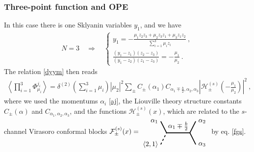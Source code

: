 \documentclass[12pt, a4paper, notitlepage, twoside]{report}
\numberwithin{equation}{section}
\theoremstyle{break}
\begin{document}
\subsubsection{Three-point function and OPE}

In this case there is one Sklyanin variables $y_1$, and we have
\begin{align}
 N=3 \quad \Rightarrow \quad  \left\{\begin{array}{l} y_1 = -\frac{\mu_1z_2z_3+\mu_2z_3z_1+\mu_3z_1z_2}{\sum_{i=1}^3\mu_iz_i}\ , \\ \frac{(y_1-z_1)(z_2-z_3)}{(y_1-z_2)(z_1-z_3)} = -\frac{\mu_1}{\mu_2}\ . \end{array}\right.
\end{align}
The relation \eqref{dyym} then reads 
\begin{align}
 \left\langle \prod_{i=1}^3\Phi^{j_i}_{\mu_i} \right\rangle = \delta^{(2)}(\textstyle{\sum}_{i=1}^3\mu_i) |\mu_2|^2 \sum_\pm C_\pm(\alpha_1)C_{\alpha_1\mp\frac{b}{2},\alpha_2,\alpha_3} \left|\mathcal{H}^{(s)}_\pm(-\tfrac{\mu_1}{\mu_2})  \right|^2\ , 
\label{sfpm}
\end{align}
where we used the momentums $\alpha_i$ \eqref{aj}, the Liouville theory structure constants $C_\pm(\alpha)$ and $C_{\alpha_1,\alpha_2,\alpha_3}$, and the functions $\mathcal{H}^{(s)}_\pm(x)$, which are related to the 
$s$-channel Virasoro conformal blocks  
$
 \mathcal{F}^{(s)}_\pm(x)  =  
\begin{tikzpicture}[baseline=(current  bounding  box.center), very thick, scale = .3]
\draw (-1,2) node [left] {$\alpha_1$} -- (0,0) -- node [above] {$\alpha_1\mp \frac{b}{2}$} (4,0) -- (5,2) node [right] {$\alpha_2$};
\draw[dashed] (-1,-2) node [left] {$\langle 2,1 \rangle$} -- (0,0);
\draw (4,0) -- (5,-2) node [right] {$\alpha_3$};
\end{tikzpicture}
$
by eq. \eqref{fgs}. 
\end{document}
